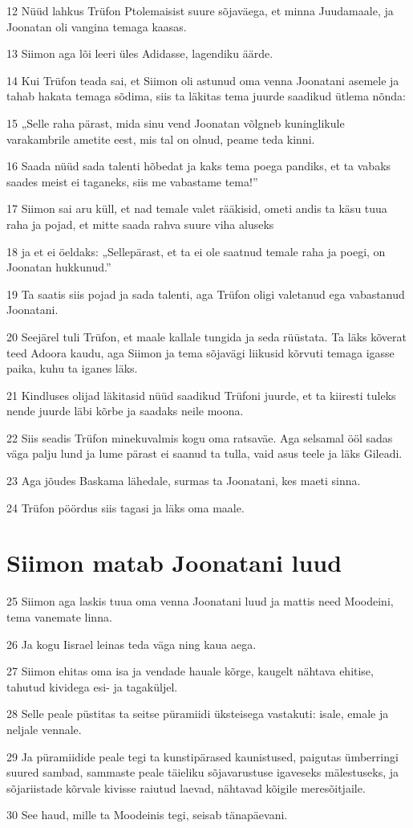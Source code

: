 \par 12 Nüüd lahkus Trüfon Ptolemaisist suure sõjaväega, et minna Juudamaale, ja Joonatan oli vangina temaga kaasas.
\par 13 Siimon aga lõi leeri üles Adidasse, lagendiku äärde.
\par 14 Kui Trüfon teada sai, et Siimon oli astunud oma venna Joonatani asemele ja tahab hakata temaga sõdima, siis ta läkitas tema juurde saadikud ütlema nõnda:
\par 15 „Selle raha pärast, mida sinu vend Joonatan võlgneb kuninglikule varakambrile ametite eest, mis tal on olnud, peame teda kinni.
\par 16 Saada nüüd sada talenti hõbedat ja kaks tema poega pandiks, et ta vabaks saades meist ei taganeks, siis me vabastame tema!”
\par 17 Siimon sai aru küll, et nad temale valet rääkisid, ometi andis ta käsu tuua raha ja pojad, et mitte saada rahva suure viha aluseks
\par 18 ja et ei öeldaks: „Sellepärast, et ta ei ole saatnud temale raha ja poegi, on Joonatan hukkunud.”
\par 19 Ta saatis siis pojad ja sada talenti, aga Trüfon oligi valetanud ega vabastanud Joonatani.
\par 20 Seejärel tuli Trüfon, et maale kallale tungida ja seda rüüstata. Ta läks kõverat teed Adoora kaudu, aga Siimon ja tema sõjavägi liikusid kõrvuti temaga igasse paika, kuhu ta iganes läks.
\par 21 Kindluses olijad läkitasid nüüd saadikud Trüfoni juurde, et ta kiiresti tuleks nende juurde läbi kõrbe ja saadaks neile moona.
\par 22 Siis seadis Trüfon minekuvalmis kogu oma ratsaväe. Aga selsamal ööl sadas väga palju lund ja lume pärast ei saanud ta tulla, vaid asus teele ja läks Gileadi.
\par 23 Aga jõudes Baskama lähedale, surmas ta Joonatani, kes maeti sinna.
\par 24 Trüfon pöördus siis tagasi ja läks oma maale. 

\section*{Siimon matab Joonatani luud}

\par 25 Siimon aga laskis tuua oma venna Joonatani luud ja mattis need Moodeini, tema vanemate linna.
\par 26 Ja kogu Iisrael leinas teda väga ning kaua aega.
\par 27 Siimon ehitas oma isa ja vendade hauale kõrge, kaugelt nähtava ehitise, tahutud kividega esi- ja tagaküljel.
\par 28 Selle peale püstitas ta seitse püramiidi üksteisega vastakuti: isale, emale ja neljale vennale.
\par 29 Ja püramiidide peale tegi ta kunstipärased kaunistused, paigutas ümberringi suured sambad, sammaste peale täieliku sõjavarustuse igaveseks mälestuseks, ja sõjariistade kõrvale kivisse raiutud laevad, nähtavad kõigile meresõitjaile.
\par 30 See haud, mille ta Moodeinis tegi, seisab tänapäevani. 

